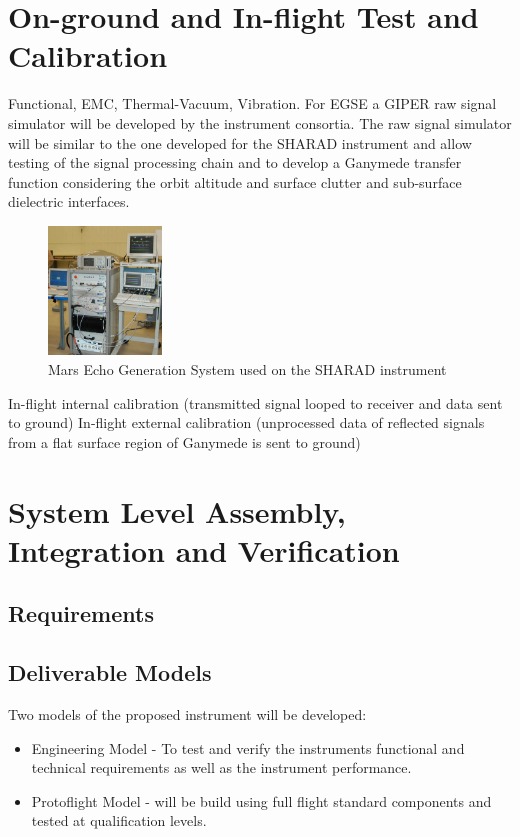 \section{On-ground and In-flight Test and Calibration}
%
Functional, EMC, Thermal-Vacuum, Vibration.
%
%
For \ac{EGSE} a \ac{GIPER} raw signal simulator will be developed by the instrument consortia. The raw signal simulator will be similar to the one developed for the \ac{SHARAD} instrument\cite{Giovanni} and allow testing of the signal processing chain and to develop a Ganymede transfer function considering the orbit altitude and surface clutter and sub-surface dielectric interfaces. 
%
%
\begin{figure}
\centering
\includegraphics[width=0.27\textwidth]{Figures/MEGS}
\caption[caption]{Mars Echo Generation System used on the SHARAD instrument\cite{MEGS}}
\label{fig:MEGS}
\end{figure}
%
%
In-flight internal calibration (transmitted signal looped to receiver and data sent to ground)
In-flight external calibration (unprocessed data of reflected signals from a flat surface region of Ganymede is sent to ground)
%
%
\section{System Level Assembly, Integration and Verification}
%
%
\subsection{Requirements}
\subsection{Deliverable Models}
%
Two models of the proposed instrument will be developed:
\begin{itemize}
\item Engineering Model - To test and verify the instruments functional and technical requirements as well as the instrument performance.\\
\item Protoflight Model - will be build using full flight standard components and tested at qualification levels.
\end{itemize}
%
